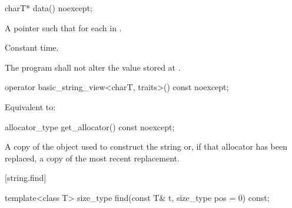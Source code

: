 %
\begin{itemdecl}
charT* data() noexcept;
\end{itemdecl}

\begin{itemdescr}
\pnum
\returns A pointer  such that  for each
 in .

\pnum
\complexity Constant time.

\pnum
\requires
The program shall not alter the value stored at .
\end{itemdescr}

%
\begin{itemdecl}
operator basic_string_view<charT, traits>() const noexcept;
\end{itemdecl}

\begin{itemdescr}
\pnum
\effects Equivalent to:
\end{itemdescr}

%
\begin{itemdecl}
allocator_type get_allocator() const noexcept;
\end{itemdecl}

\begin{itemdescr}
\pnum
\returns
A copy of the
object used to construct the string or, if that allocator has been replaced, a
copy of the most recent replacement.
\end{itemdescr}

[string.find]{}

%
\begin{itemdecl}
template<class T>
  size_type find(const T& t, size_type pos = 0) const;
\end{itemdecl}

